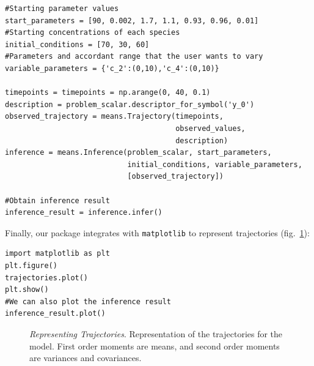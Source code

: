 \begin{framed}
\begin{verbatim}
#Starting parameter values
start_parameters = [90, 0.002, 1.7, 1.1, 0.93, 0.96, 0.01]
#Starting concentrations of each species
initial_conditions = [70, 30, 60]
#Parameters and accordant range that the user wants to vary
variable_parameters = {'c_2':(0,10),'c_4':(0,10)}
        
timepoints = timepoints = np.arange(0, 40, 0.1)
description = problem_scalar.descriptor_for_symbol('y_0')
observed_trajectory = means.Trajectory(timepoints,
                                       observed_values,
                                       description)
inference = means.Inference(problem_scalar, start_parameters, 
                            initial_conditions, variable_parameters, 
                            [observed_trajectory])

#Obtain inference result
inference_result = inference.infer()
\end{verbatim}
\end{framed}

Finally, our package integrates with \texttt{matplotlib} to represent trajectories (fig.~\ref{fig:trajectories_exple}):

\begin{framed}
\begin{verbatim}
import matplotlib as plt
plt.figure()
trajectories.plot()
plt.show()
#We can also plot the inference result
inference_result.plot()
\end{verbatim}
\end{framed}

\begin{figure}
\caption{\emph{Representing Trajectories}.
Representation of the trajectories for the \pft{} model.
First order moments are means, and second order moments are variances and covariances.
}
\label{fig:trajectories_exple}
\end{figure}



